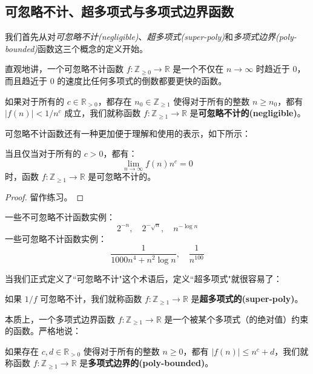 \subsection{可忽略不计、超多项式与多项式边界函数}\label{subsec:2-3-1}

我们首先从对\emph{可忽略不计(negligible)}、\emph{超多项式(super-poly)}和\emph{多项式边界(poly-bounded)}函数这三个概念的定义开始。

直观地讲，一个可忽略不计函数 $f:\mathbb{Z}_{\geq0}\to\mathbb{R}$ 是一个不仅在 $n\to\infty$ 时趋近于 $0$，而且趋近于 $0$ 的速度比任何多项式的倒数都要更快的函数。

\begin{definition}\label{def:2-5}
如果对于所有的 $c\in\mathbb{R}_{>0}$，都存在 $n_0\in\mathbb{Z}_{\geq 1}$ 使得对于所有的整数 $n\geq n_0$，都有 $|f(n)|<{1}/{n^c}$ 成立，我们就称函数 $f:\mathbb{Z}_{\geq1}\to\mathbb{R}$ 是\textbf{可忽略不计的(negligible)}。
\end{definition}

可忽略不计函数还有一种更加便于理解和使用的表示，如下所示：

\begin{theorem}\label{theo:2-11}
当且仅当对于所有的 $c>0$，都有：
\[
\lim_{n\to\infty}f(n)n^c=0
\]
时，函数 $f:\mathbb{Z}_{\geq1}\to\mathbb{R}$ 是可忽略不计的。
\end{theorem}

\begin{proof}
留作练习。
\end{proof}

\begin{example}\label{exmp:2-10}
一些不可忽略不计函数实例：
\[
2^{-n},
\quad
2^{-\sqrt{n}},
\quad
n^{-\log n}
\]
一些可忽略不计函数实例：
\[
\frac{1}{1000n^4+n^2\log n},
\quad
\frac{1}{n^{100}}
\]
\end{example}

当我们正式定义了``可忽略不计"这个术语后，定义``超多项式"就很容易了：

\begin{definition}\label{def:2-6}
如果 $1/f$ 可忽略不计，我们就称函数 $f:\mathbb{Z}_{\geq1}\to\mathbb{R}$ 是\textbf{超多项式的(super-poly)}。
\end{definition}

本质上，一个多项式边界函数 $f:\mathbb{Z}_{\geq1}\to\mathbb{R}$ 是一个被某个多项式（的绝对值）约束的函数。严格地说：

\begin{definition}\label{def:2-7}
如果存在 $c,d\in\mathbb{R}_{>0}$ 使得对于所有的整数 $n\geq0$，都有 $|f(n)|\leq n^c+d$，我们就称函数 $f:\mathbb{Z}_{\geq1}\to\mathbb{R}$ 是\textbf{多项式边界的(poly-bounded)}。
\end{definition}

